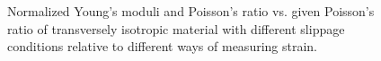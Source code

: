 \documentclass[3p]{elsarticle}
\begin{document}
\begin{center}
\begin{figure}[h]

\caption{Normalized Young's moduli and Poisson's ratio vs. given Poisson's ratio
of transversely isotropic material with different slippage conditions relative
to different ways of measuring strain.}
\label{fig:strainmethods}


\end{figure}
\end{center}
\end{document}
